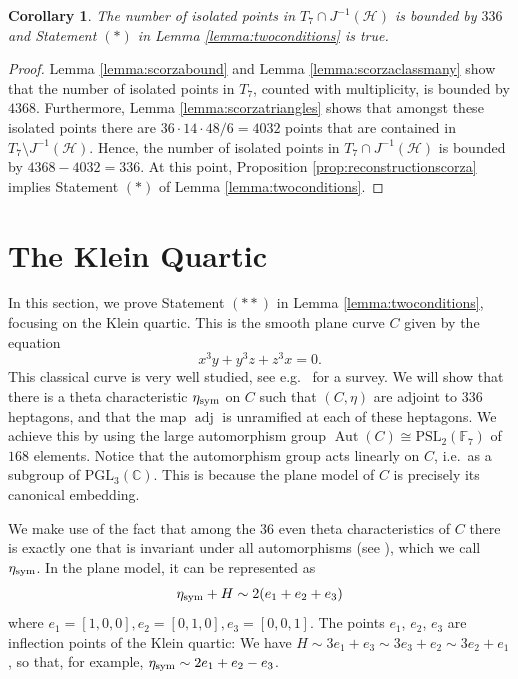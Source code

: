\documentclass[12pt]{article}
\newtheorem{corollary}[theorem]{Corollary}
\numberwithin{equation}{section}
\theoremstyle{definition}
\newcommand{\etasym}{\eta_{\rm sym}}
\begin{document}
\begin{corollary}\label{cor:conditionone}
	The number of isolated points in $T_7 \cap J^{-1}(\mathcal{H})$ is bounded by $336$ and Statement $(*)$ in Lemma \ref{lemma:twoconditions} is true.
\end{corollary}
\begin{proof}
	Lemma \ref{lemma:scorzabound} and Lemma \ref{lemma:scorzaclassmany} show that the number of isolated points in $T_7$, counted with multiplicity, is bounded by $4368$. Furthermore, Lemma \ref{lemma:scorzatriangles} shows that amongst these isolated points there are $36\cdot 14\cdot 48/6 = 4032$ points that are contained in $T_7 \setminus J^{-1}(\mathcal{H})$. Hence, the number of isolated points in $T_7 \cap J^{-1}(\mathcal{H})$ is bounded by $4368-4032 = 336$. At this point, Proposition \ref{prop:reconstructionscorza} implies Statement $(*)$ of Lemma \ref{lemma:twoconditions}.  
\end{proof}


\section{The Klein Quartic}\label{sec:kleinquartic}

In this section, we prove Statement $(**)$ in Lemma \ref{lemma:twoconditions}, focusing on the Klein quartic. This is the smooth plane curve $C$ given by the equation
\[x^3y + y^3z + z^3 x=0.\]
This classical curve is very well studied, see e.g.~\cite{zbMATH01574981} for a survey. We will show that there is a theta characteristic $\etasym$ on $C$ such that $(C,\eta)$ are adjoint to $336$ heptagons, and that the map $\operatorname{adj}$ is unramified at each of these heptagons. We achieve this by using the large automorphism group $\operatorname{Aut}(C) \cong \mathrm{PSL}_2(\mathbb{F}_7)$ of $168$ elements. Notice that the automorphism group acts linearly on $C$, i.e.~as a subgroup of $\mathrm{PGL}_3(\mathbb{C})$. This is because the plane model of $C$ is precisely its canonical embedding.

We make use of the fact that among the $36$ even theta characteristics of $C$ there is exactly one that is invariant under all automorphisms (see \cite{zbMATH05874806}), which we call $\etasym$. In the plane model, it can be represented as \[\etasym + H \sim 2(e_1 + e_2 + e_3)\] where $e_1 = [1,0,0], e_2=[0,1,0], e_3=[0,0,1]$. The points $e_1$, $e_2$, $e_3$ are inflection points of the Klein quartic: We have $H \sim 3 e_1 + e_3 \sim 3 e_3 + e_2 \sim 3 e_2 + e_1$, so that, for example, $\etasym \sim 2e_1 + e_2 - e_3$.
\end{document}
